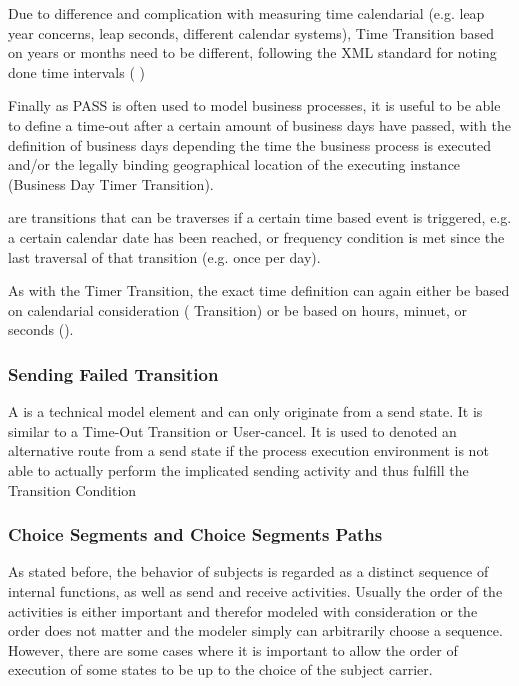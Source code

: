 Due to difference and complication with measuring time calendarial (e.g. leap year concerns, leap seconds, different calendar systems), Time Transition based on years or months need to be different, following the XML standard for noting done time intervals ( )

Finally as PASS is often used to model business processes, it is useful to be able to define a time-out after a certain amount of business days have passed, with the definition of business days depending the time the business process is executed and/or the legally binding geographical location of the executing instance (Business Day Timer Transition).

 are transitions that can be traverses if a certain time based event is triggered, e.g. a certain calendar date has been reached, or frequency condition is met  since the last traversal of that transition (e.g. once per day).

As with the Timer Transition, the exact time definition can again either be based on calendarial consideration ( Transition) or be based on hours, minuet, or seconds ().


\subsubsection{Sending Failed Transition}

A  is a technical model element and can only originate from a send state. It is similar to a Time-Out Transition or User-cancel. It is used to denoted an alternative route from a send state if the process execution environment is not able to actually perform the implicated sending activity and thus fulfill the Transition Condition

\subsubsection{Choice Segments and Choice Segments Paths}
\label{sec:choiceSegement}

As stated before, the behavior of subjects is regarded as a distinct sequence of internal functions, as well as send and receive activities. Usually the order of the activities is either important and therefor modeled with consideration or the order does not matter and the modeler simply can arbitrarily choose a sequence. However, there are some cases where it is important to allow the order of execution of some states to be up to the choice of the subject carrier.

